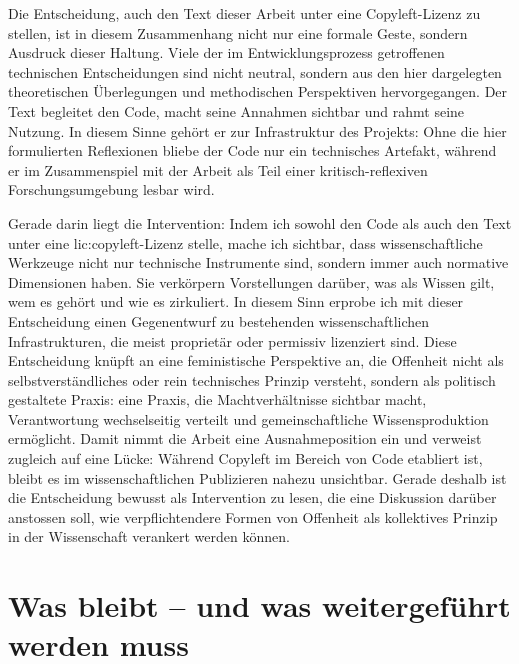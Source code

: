 Die Entscheidung, auch den Text dieser Arbeit unter eine Copyleft-Lizenz zu stellen, ist in diesem Zusammenhang nicht nur eine formale Geste, sondern Ausdruck dieser Haltung. Viele der im Entwicklungsprozess getroffenen technischen Entscheidungen sind nicht neutral, sondern aus den hier dargelegten theoretischen Überlegungen und methodischen Perspektiven hervorgegangen. Der Text begleitet den Code, macht seine Annahmen sichtbar und rahmt seine Nutzung. In diesem Sinne gehört er zur Infrastruktur des Projekts: Ohne die hier formulierten Reflexionen bliebe der Code nur ein technisches Artefakt, während er im Zusammenspiel mit der Arbeit als Teil einer kritisch-reflexiven Forschungsumgebung lesbar wird. 

Gerade darin liegt die Intervention: Indem ich sowohl den Code als auch den Text unter eine \gls{lic:copyleft}-Lizenz stelle, mache ich sichtbar, dass wissenschaftliche Werkzeuge nicht nur technische Instrumente sind, sondern immer auch normative Dimensionen haben. Sie verkörpern Vorstellungen darüber, was als Wissen gilt, wem es gehört und wie es zirkuliert. In diesem Sinn erprobe ich mit dieser Entscheidung einen Gegenentwurf zu bestehenden wissenschaftlichen Infrastrukturen, die meist proprietär oder permissiv lizenziert sind. Diese Entscheidung knüpft an eine feministische Perspektive an, die Offenheit nicht als selbstverständliches oder rein technisches Prinzip versteht, sondern als politisch gestaltete Praxis: eine Praxis, die Machtverhältnisse sichtbar macht, Verantwortung wechselseitig verteilt und gemeinschaftliche Wissensproduktion ermöglicht. Damit nimmt die Arbeit eine Ausnahmeposition ein und verweist zugleich auf eine Lücke: Während Copyleft im Bereich von Code etabliert ist, bleibt es im wissenschaftlichen Publizieren nahezu unsichtbar. Gerade deshalb ist die Entscheidung bewusst als Intervention zu lesen, die eine Diskussion darüber anstossen soll, wie verpflichtendere Formen von Offenheit als kollektives Prinzip in der Wissenschaft verankert werden können.


\section{Was bleibt -- und was weitergeführt werden muss}

